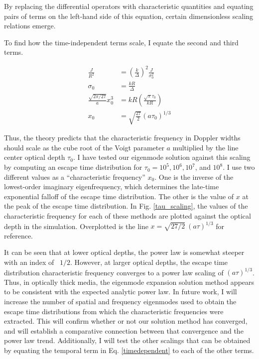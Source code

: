 \documentclass[onecolumn]{aastex63}
\begin{document}
By replacing the differential operators with characteristic quantities and equating pairs of terms on the left-hand side of this equation, certain dimensionless scaling relations emerge. 

To find how the time-independent terms scale, I equate the second and third terms.

\begin{equation}
\begin{split}
    \frac{J}{R^2} &= \left(\frac{k}{\Delta}\right)^2 \frac{J}{\sigma_0^2}\\
    \sigma_0 &= \frac{kR}{\Delta}\\
    \frac{\sqrt{2\pi/27}}{a}x_0^3 &= kR \left(\frac{\sqrt{\pi}\tau_0}{kR}\right)\\
    x_0 &= \sqrt{\frac{27}{2}}\left(a\tau_0\right)^{1/3}
    \end{split}
\end{equation}

Thus, the theory predicts that the characteristic frequency in Doppler widths should scale as the cube root of the Voigt parameter $a$ multiplied by the line center optical depth $\tau_0$. I have tested our eigenmode solution against this scaling by computing an escape time distribution for $\tau_0 = 10^5, 10^6, 10^7$, and $10^8$. I use two different values as a ``characteristic frequency'' $x_0$. One is the inverse of the lowest-order imaginary eigenfrequency, which determines the late-time exponential falloff of the escape time distribution. The other is the value of $x$ at the peak of the escape time distribution. In Fig. \ref{tau_scaling}, the values of the characteristic frequency for each of these methods are plotted against the optical depth in the simulation. Overplotted is the line $x = \sqrt{27/2}\ (a\tau)^{1/3}$ for reference.

It can be seen that at lower optical depths, the power law is somewhat steeper with an index of ~$1/2$. However, at larger optical depths, the escape time distribution characteristic frequency converges to a power law scaling of $(a\tau)^{1/3}$. Thus, in optically thick media, the eigenmode expansion solution method appears to be consistent with the expected analytic power law. In future work, I will increase the number of spatial and frequency eigenmodes used to obtain the escape time distributions from which the characteristic frequencies were extracted. This will confirm whether or not our solution method has converged, and will establish a comparative connection between that convergence and the power law trend. Additionally, I will test the other scalings that can be obtained by equating the temporal term in Eq. \ref{timedependent} to each of the other terms.
\end{document}
